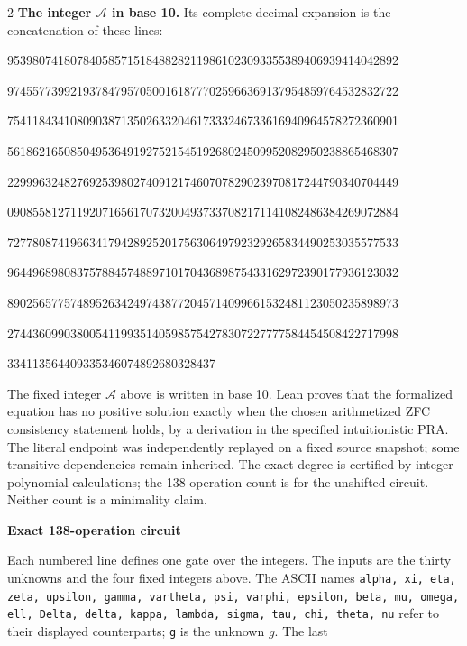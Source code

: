 \documentclass[10pt]{article}
\begin{document}
\begin{multicols}{2}
\textbf{The integer $\mathcal A$ in base 10.}
Its complete decimal expansion is the concatenation of these lines:\par
\begingroup\fontsize{7.7}{8.2}\selectfont{}\par
95398074180784058571518488282119861023093355389406939414042892\par
97455773992193784795705001618777025966369137954859764532832722\par
75411843410809038713502633204617333246733616940964578272360901\par
56186216508504953649192752154519268024509952082950238865468307\par
22999632482769253980274091217460707829023970817244790340704449\par
09085581271192071656170732004937337082171141082486384269072884\par
72778087419663417942892520175630649792329265834490253035577533\par
96449689808375788457488971017043689875433162972390177936123032\par
89025657757489526342497438772045714099661532481123050235898973\par
27443609903800541199351405985754278307227777584454508422717998\par
334113564409335346074892680328437\par
\endgroup
\normalfont\fontsize{7.7}{8.2}\selectfont
The fixed integer $\mathcal A$ above is written in base 10. Lean proves that the formalized equation has no positive solution exactly
when the chosen arithmetized ZFC consistency statement holds, by a derivation
in the specified intuitionistic PRA. The literal endpoint was independently
replayed on a fixed source snapshot; some transitive dependencies remain
inherited. The exact degree is certified by integer-polynomial calculations;
the 138-operation count is for the unshifted circuit. Neither count is a
minimality claim.
\end{multicols}
\clearpage
\begin{center}{\large\bfseries Exact 138-operation circuit}\end{center}
Each numbered line defines one gate over the integers. The inputs are the
thirty unknowns and the four fixed integers above. The ASCII names
\texttt{alpha, xi, eta, zeta, upsilon, gamma, vartheta, psi, varphi, epsilon, beta, mu, omega, ell, Delta, delta, kappa, lambda, sigma, tau, chi, theta, nu}
refer to their displayed counterparts; \texttt{g} is the unknown $g$. The last
\end{document}
